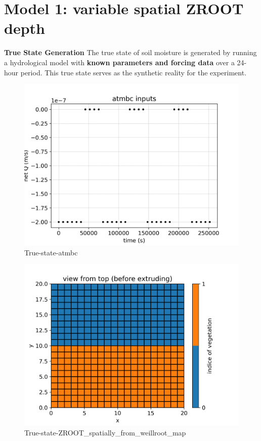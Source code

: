 \documentclass{article}
\begin{document}
\section{Model 1: variable spatial ZROOT depth}

\textbf{True State Generation}
The true state of soil moisture is generated by running a hydrological model with \textbf{known parameters and forcing data} over a 24-hour period. This true state serves as the synthetic reality for the experiment.

\begin{figure}[!htbp]
\centering
\includegraphics[width=0.75\linewidth]{files/atmbc-312192448aa4c0a1e57cb587d79a2dbc.png}
\caption[]{True-state-atmbc}
\label{true-state-atmbc}
\end{figure}

\begin{figure}[!htbp]
\centering
\includegraphics[width=0.75\linewidth]{files/ZROOT_spatially_from-7ecc3d61ffe164d15040448f6d1d09eb.png}
\caption[]{True-state-ZROOT\_spatially\_from\_weillroot\_map}
\label{true-state-ZROOT_spatially_from_weillroot_map}
\end{figure}
\end{document}
